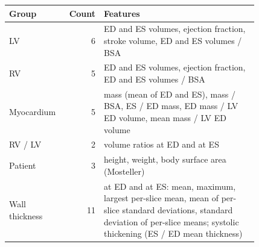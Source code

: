 \begin{tabular}{p{0.2\linewidth}rp{0.62\linewidth}}
\toprule
Group & Count & Features\\
\midrule
LV & 6 & ED and ES volumes, ejection fraction, stroke volume, ED and ES volumes / BSA\\
RV & 5 & ED and ES volumes, ejection fraction, ED and ES volumes / BSA\\
Myocardium & 5 & mass (mean of ED and ES), mass / BSA, ES / ED mass, ED mass / LV ED volume, mean mass / LV ED volume\\
RV / LV & 2 & volume ratios at ED and at ES\\
Patient & 3 & height, weight, body surface area (Mosteller)\\
\midrule
Wall thickness & 11 & at ED and at ES: mean, maximum, largest per-slice mean, mean of per-slice standard deviations, standard deviation of per-slice means; systolic thickening (ES / ED mean thickness)\\
\bottomrule
\end{tabular}
\caption{Features. The first 21 are the \emph{volumetric} features. The \emph{compact} set keeps 12 of them: the 6 indexed volumes and ejection fractions, mass / BSA, the RV / LV volume ratio at ED, mean mass / LV ED volume, the largest per-slice mean and the mean per-slice standard deviation of the ED wall thickness, and the systolic thickening.}
\label{tab:features}

